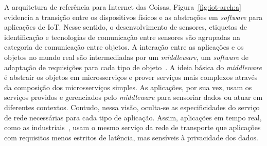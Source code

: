 \documentclass[12pt]{article}
\begin{document}
A arquitetura de referência para Internet das Coisas, Figura~\ref{fig:iot-arch:a} evidencia a transição entre os dispositivos físicos e as abstrações em \textit{software} para aplicações de IoT. 
Nesse sentido, o desenvolvimento de sensores, etiquetas de identificação e tecnologias de comunicação entre sensores são agrupadas na categoria de comunicação entre objetos.  A interação entre as aplicações e os objetos no mundo real são intermediadas por um \textit{middleware}, um \textit{software} de adaptação de requisições para cada tipo de objeto~\cite{interscity-paper}. A ideia básica do \textit{middleware} é abstrair os objetos em microsserviços e prover serviços mais complexos através da composição dos microsserviços simples. 
As aplicações, por sua vez, usam os serviços providos e gerenciados pelo \textit{middleware} para sensoriar dados ou atuar em diferentes contextos. 
Contudo, nessa visão, oculta-se as especificidades do serviço de rede necessárias para cada tipo de aplicação. Assim, aplicações em tempo real, como as industriais~\cite{industria4.0}, usam o mesmo serviço da rede de transporte que aplicações com requisitos menos estritos de latência, mas sensíveis à privacidade dos dados.
\end{document}
